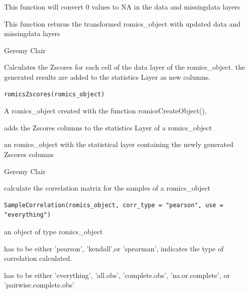 \documentclass[a4paper]{book}
\begin{document}
%
\begin{Details}
This function will convert 0 values to NA in the data and missingdata layers
\end{Details}
%
\begin{Value}
This function returns the transformed romics\_object with updated data and missingdata layers
\end{Value}
%
\begin{Author}
Geremy Clair
\end{Author}
%
\begin{Description}
Calculates the Zscores for each cell of the data layer of the romics\_object. the generated results are added to the statistics Layer as new columns.
\end{Description}
%
\begin{Usage}
\begin{verbatim}
romicsZscores(romics_object)
\end{verbatim}
\end{Usage}
%
\begin{Arguments}
\begin{ldescription}
\item[\code{romics\_object}] A romics\_object created with the function romicsCreateObject(),
\end{ldescription}
\end{Arguments}
%
\begin{Details}
adds the Zscores columns to the statistics Layer of a romics\_object
\end{Details}
%
\begin{Value}
an romics\_object with the statistical layer containing the newly generated Zscores columns
\end{Value}
%
\begin{Author}
Geremy Clair
\end{Author}
%
\begin{Description}
calculate the correlation matrix for the samples of a romics\_object
\end{Description}
%
\begin{Usage}
\begin{verbatim}
SampleCorrelation(romics_object, corr_type = "pearson", use = "everything")
\end{verbatim}
\end{Usage}
%
\begin{Arguments}
\begin{ldescription}
\item[\code{romics\_object}] an object of type romics\_object

\item[\code{corr\_type}] has to be either 'pearson', 'kendall',or 'spearman', indicates the type of correlation calculated.

\item[\code{use}] has to be either 'everything', 'all.obs', 'complete.obs', 'na.or.complete', or 'pairwise.complete.obs'
\end{ldescription}
\end{Arguments}
\end{document}
